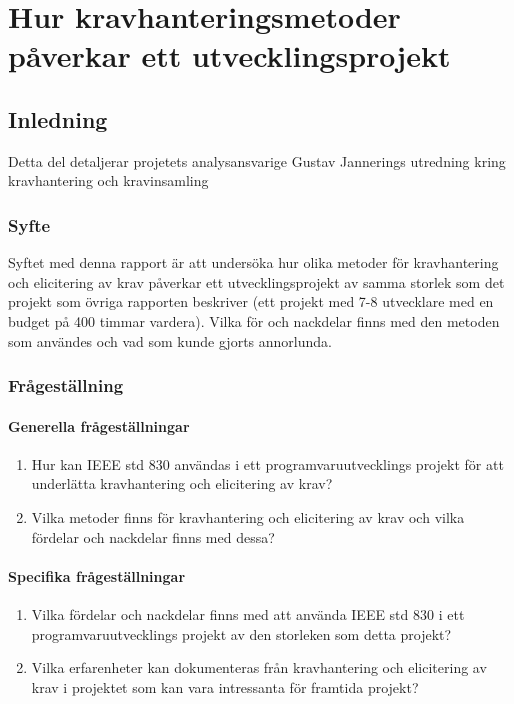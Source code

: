 \chapter{Hur kravhanteringsmetoder påverkar ett utvecklingsprojekt}
\label{cha:indiv-report-jannering}

\section{Inledning}
\label{sec:introduction-jannering}

Detta del detaljerar projetets analysansvarige Gustav Jannerings utredning kring kravhantering och kravinsamling

\subsection{Syfte}
\label{sec:purpose-jannering}

Syftet med denna rapport är att undersöka hur olika metoder för kravhantering och elicitering av krav påverkar ett utvecklingsprojekt av samma storlek som det projekt som övriga rapporten beskriver (ett projekt med 7-8 utvecklare med en budget på 400 timmar vardera). Vilka för och nackdelar finns med den metoden som användes och vad som kunde gjorts annorlunda.
\subsection{Frågeställning}
\label{sec:issue-jannering}

\subsubsection{Generella frågeställningar}
\begin{enumerate}
	\item Hur kan IEEE std 830 användas i ett programvaruutvecklings projekt för att underlätta kravhantering och elicitering av krav?
	
	\item Vilka metoder finns för kravhantering och elicitering av krav och vilka fördelar och nackdelar finns med dessa? 
\end{enumerate}
\subsubsection{Specifika frågeställningar}
\begin{enumerate}
	\item Vilka fördelar och nackdelar finns med att använda IEEE std 830 i ett programvaruutvecklings projekt av den storleken som detta projekt?
	
	\item Vilka erfarenheter kan dokumenteras från kravhantering och elicitering av krav i projektet som kan vara intressanta
	för framtida projekt?
	
\end{enumerate}
